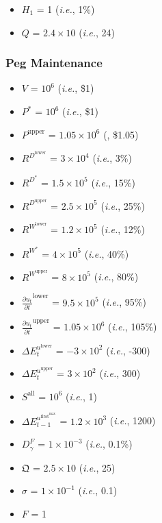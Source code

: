 \documentclass[class=article, crop=false]{standalone}
\begin{document}
\begin{itemize}[topsep=0pt, itemsep=3pt,leftmargin=16pt]
    \item $H_{1}$ = 1 (\textit{i.e.}, 1\%)
    \item $Q$ = $2.4 \times 10$ (\textit{i.e.}, 24)
\end{itemize}


\subsubsection{Peg Maintenance}

\begin{itemize}[topsep=0pt, itemsep=3pt,leftmargin=16pt]
    \item $V$ = $10^{6}$ (\textit{i.e.}, \$1)
    \item $P^{*}$ = $10^{6}$ (\textit{i.e.}, \$1)
    \item $P^{\text{upper}}$ = $1.05 \times 10^{6}$ (, \$1.05)
    \item $R^{D^{\text{lower}}}$ = $3 \times 10^{4}$ (\textit{i.e.}, 3\%)
    \item $R^{D^{*}}$ = $1.5 \times 10^{5}$ (\textit{i.e.}, 15\%)
    \item $R^{D^{\text{upper}}}$ = $2.5 \times 10^{5}$ (\textit{i.e.}, 25\%)
    \item $R^{W^{\text{lower}}}$ = $1.2 \times 10^{5}$ (\textit{i.e.}, 12\%)
    \item $R^{W^{*}}$ = $4 \times 10^{5}$ (\textit{i.e.}, 40\%)
    \item $R^{W^{\text{upper}}}$ = $8 \times 10^{5}$ (\textit{i.e.}, 80\%)
    \item $\frac{\partial u_{t}}{\partial t}^{\text{lower}}$ = $9.5 \times 10^{5}$ (\textit{i.e.}, 95\%)
    \item $\frac{\partial u_{t}}{\partial t}^{\text{upper}}$ = $1.05 \times 10^{6}$ (\textit{i.e.}, 105\%)
    \item $\Delta E_{t}^{u^{\text{lower}}}$ = $-3 \times 10^{2}$ (\textit{i.e.}, -300)
    \item $\Delta E_{t}^{u^{\text{upper}}}$ = $3 \times 10^{2}$ (\textit{i.e.}, 300)
    \item $S^{\text{all}}$ = $10^{6}$ (\textit{i.e.}, 1)
    \item $\Delta E_{t-1}^{u^{\text{first}^{\text{max}}}}$ = $1.2 \times 10^{3}$ (\textit{i.e.}, 1200)
    \item $D_{\gamma}^{F}$ = $1 \times 10^{-3}$ (\textit{i.e.}, 0.1\%)
    \item $\mathfrak{Q}$ = $2.5 \times 10$ (\textit{i.e.}, 25)
    \item $\sigma$ = $1 \times 10^{-1}$ (\textit{i.e.}, 0.1)
    \item $F$ = 1
\end{itemize}
\end{document}
